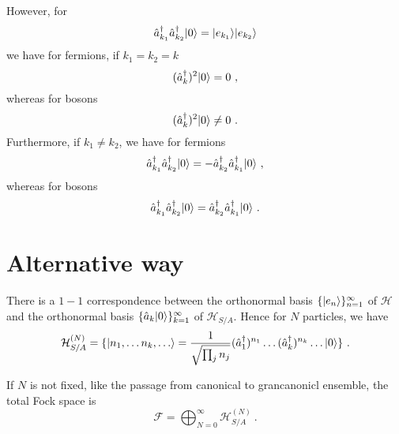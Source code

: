     However, for 
    \begin{equation*}
        \hat a_{k_1}^\dagger \hat a_{k_2}^\dagger \vert0\rangle = \vert e_{k_1}\rangle \vert e_{k_2}\rangle 
    \end{equation*}
    we have for fermions, if $k_1 = k_2 = k$
    \begin{equation*}
    (\hat a^\dagger_k)^2 \vert0\rangle = 0 ~,
    \end{equation*}
    whereas for bosons 
    \begin{equation*}
        (\hat a^\dagger_k)^2 \vert0\rangle \neq 0 ~.
    \end{equation*}
    Furthermore, if $k_1 \neq  k_2$, we have for fermions
    \begin{equation*}
        \hat a^\dagger_{k_1} \hat a^\dagger_{k_2} \vert0\rangle = - \hat a^\dagger_{k_2} \hat a^\dagger_{k_1} \vert0\rangle ~,
    \end{equation*}
    whereas for bosons 
    \begin{equation*}
        \hat a^\dagger_{k_1} \hat a^\dagger_{k_2} \vert0\rangle = \hat a^\dagger_{k_2} \hat a^\dagger_{k_1} \vert0\rangle ~.
    \end{equation*}

\section{Alternative way}

    There is a $1-1$ correspondence between the orthonormal basis  $\{\vert e_n\rangle\}_{n=1}^\infty$ of $\mathcal H$ and the orthonormal basis $\{\hat a_k \vert0\rangle\}_{k=1}^\infty$ of $\mathcal H_{S/A}$. Hence for $N$ particles, we have 
    \begin{equation*}
        \mathcal H_{S/A}^{(N)} = \{\vert n_1, \ldots n_k, \ldots\rangle = \frac{1}{\sqrt{ \prod_j n_j}} (\hat a_1^\dagger)^{n_1} \ldots (\hat a_k^\dagger)^{n_k} \ldots \vert0\rangle \} ~.
    \end{equation*} 

    If $N$ is not fixed, like the passage from canonical to grancanonicl ensemble, the total Fock space is 
    \begin{equation*}
        \mathcal F = \bigoplus_{N=0}^\infty \mathcal H^{(N)}_{S/A} ~.
    \end{equation*} 


